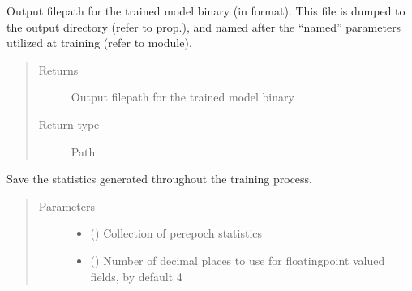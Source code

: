 \documentclass[letterpaper,10pt,english]{sphinxmanual}
\begin{document}
\begin{fulllineitems}
\begin{fulllineitems}
\label{\detokenize{code:gpt2_summarizer_train.TrainGPT2Summarizer._model_file}}
\sphinxAtStartPar
Output filepath for the trained model binary (in  format). This file is dumped to the
output directory (refer to  prop.), and named after the “named” parameters
utilized at training (refer to  module).
\begin{quote}\begin{description}
\item[{Returns}] \leavevmode
\sphinxAtStartPar
Output filepath for the trained model binary

\item[{Return type}] \leavevmode
\sphinxAtStartPar
Path

\end{description}\end{quote}

\end{fulllineitems}


\begin{fulllineitems}
\label{\detokenize{code:gpt2_summarizer_train.TrainGPT2Summarizer._save_train_stats}}
\sphinxAtStartPar
Save the statistics generated throughout the training process.
\begin{quote}\begin{description}
\item[{Parameters}] \leavevmode\begin{itemize}
\item {} 
\sphinxAtStartPar
{} () \textendash{} Collection of per\sphinxhyphen{}epoch statistics

\item {} 
\sphinxAtStartPar
{} (\sphinxstyleliteralemphasis{\sphinxupquote{, }}) \textendash{} Number of decimal places to use for floating\sphinxhyphen{}point valued fields, by
default 4


\end{itemize}
\end{description}
\end{quote}
\end{fulllineitems}
\end{fulllineitems}
\end{document}
